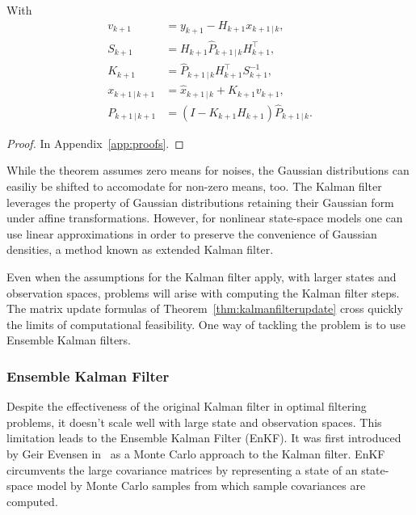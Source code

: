\begin{theorem}
\begin{enumerate}
            With 
            \begin{subequations}\label{eq:kalmanupdatestep}
                \begin{align}
                    v_{k+1} &= y_{k+1} - H_{k+1}x_{k+1 \, \vert \, k},\\
                    S_{k+1} &= H_{k+1} \hat{P}_{k+1\,\vert\,k} H_{k+1}^{\top},\\
                    K_{k+1} &= \hat{P}_{k+1\,\vert\,k}  H_{k+1}^{\top} S_{k+1}^{-1},\\
                    x_{k+1\,\vert\,k+1} &= \hat{x}_{k+1\,\vert\,k} + K_{k+1} v_{k+1},\\
                    P_{k+1\,\vert\,k+1} &= (I-K_{k+1}H_{k+1})\hat{P}_{k+1\,\vert\,k}.
                \end{align}
            \end{subequations}
    \end{enumerate}
\end{theorem}
\begin{proof}
    In Appendix~\ref{app:proofs}.
\end{proof}
While the theorem assumes zero means for noises, the Gaussian distributions can easiliy be shifted to accomodate for non-zero means, too.
The Kalman filter leverages the property of Gaussian distributions retaining their Gaussian form under affine transformations.
However, for nonlinear state-space models one can use linear approximations in order to preserve the convenience of Gaussian densities, a method known as extended Kalman filter.

Even when the assumptions for the Kalman filter apply, with larger states and observation spaces, problems will arise with computing the Kalman filter steps.
The matrix update formulas of Theorem~\ref{thm:kalmanfilterupdate} cross quickly the limits of computational feasibility.
One way of tackling the problem is to use Ensemble Kalman filters.

\subsubsection{Ensemble Kalman Filter}
Despite the effectiveness of the original Kalman filter in optimal filtering problems, it doesn't scale well with large state and observation spaces.
This limitation leads to the Ensemble Kalman Filter (EnKF).
It was first introduced by Geir Evensen in~\cite{evensen1994} as a Monte Carlo approach to the Kalman filter.
EnKF circumvents the large covariance matrices by representing a state of an state-space model by Monte Carlo samples from which sample covariances are computed.
